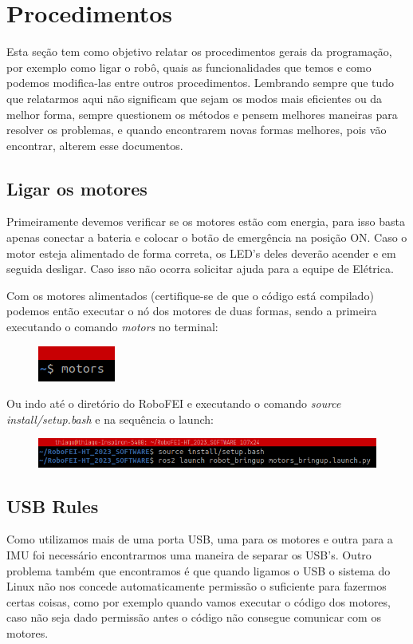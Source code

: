 \section{Procedimentos}
	Esta seção tem como objetivo relatar os procedimentos gerais da programação, por exemplo como ligar o robô, quais as funcionalidades que temos e como podemos modifica-las entre outros procedimentos. Lembrando sempre que tudo que relatarmos aqui não significam que sejam os modos mais eficientes ou da melhor forma, sempre questionem os métodos e pensem melhores maneiras para resolver os problemas, e quando encontrarem novas formas melhores, pois vão encontrar, alterem esse documentos.
	
	\subsection{Ligar os motores}
		Primeiramente devemos verificar se os motores estão com energia, para isso basta apenas conectar a bateria e colocar o botão de emergência na posição ON. Caso o motor esteja alimentado de forma correta, os LED's deles deverão acender e em seguida desligar. Caso isso não ocorra solicitar ajuda para a equipe de Elétrica.
		
		Com os motores alimentados (certifique-se de que o código está compilado) podemos então executar o nó dos motores de duas formas, sendo a primeira executando o comando \textit{motors} no terminal:
		
		\begin{figure}[H]
			\centering
			\includegraphics[scale=1]{sections/programacao/procedimentos/imagens/comando_motors.png}
		\end{figure}
		
	
		Ou indo até o diretório do RoboFEI e executando o comando \textit{source install/setup.bash} e na sequência o launch:
		
		\begin{figure}[H]
			\centering
			\includegraphics[scale=0.6]{sections/programacao/procedimentos/imagens/launch_motors.png}
		\end{figure}				
		
		
	\subsection{USB Rules}
		Como utilizamos mais de uma porta USB, uma para os motores e outra para a IMU foi necessário encontrarmos uma maneira de separar os USB's. Outro problema também que encontramos é que quando ligamos o USB o sistema do Linux não nos concede automaticamente permissão o suficiente para fazermos certas coisas, como por exemplo quando vamos executar o código dos motores, caso não seja dado permissão antes o código não consegue comunicar com os motores.
		
